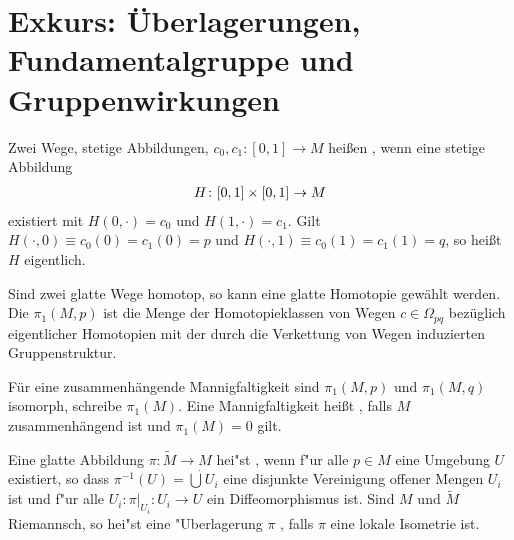 \section{Exkurs: Überlagerungen, Fundamentalgruppe und Gruppenwirkungen}

\begin{emptythm}[Erinnerung]
  Zwei Wege, stetige Abbildungen, $c_0,c_1 \colon[0,1] \to M$ heißen , wenn eine stetige Abbildung
  \begin{align*}
    H \colon [0,1]\times[0,1] \to M
  \end{align*}
  existiert mit $H(0,\cdot) = c_0$ und $H(1,\cdot) = c_1$.
  Gilt $H(\cdot, 0) \equiv c_0(0) = c_1(0) = p$ und $H(\cdot,1) \equiv c_0(1) = c_1(1) = q$, so heißt $H$ eigentlich.
\end{emptythm}

\begin{bem}
Sind zwei glatte Wege homotop, so kann eine glatte Homotopie gewählt werden.
Die  $\pi_1(M,p)$ ist die Menge der Homotopieklassen von Wegen $c \in \Omega_{pq}$ bezüglich eigentlicher Homotopien mit der durch die Verkettung von Wegen induzierten Gruppenstruktur.
\begin{center}	\end{center}
Für eine zusammenhängende Mannigfaltigkeit sind $\pi_1(M,p)$ und $\pi_1(M,q)$ isomorph, schreibe $\pi_1(M)$.
Eine Mannigfaltigkeit heißt , falls $M$ zusammenhängend ist und $\pi_1(M) = 0$ gilt.
\end{bem}

Eine glatte Abbildung $\pi: \tilde M \to M$ hei"st , wenn f"ur alle $p \in M$ eine Umgebung $U$ existiert, so dass $\pi^{-1}(U) = \dot \bigcup U_i$ eine disjunkte Vereinigung offener Mengen $U_i$ ist und f"ur alle $U_i: \pi|_{U_i}: U_i \to U$ ein Diffeomorphismus ist.
Sind $M$ und $\tilde M$ Riemannsch, so hei"st eine "Uberlagerung $\pi$ , falls $\pi$ eine lokale Isometrie ist.

